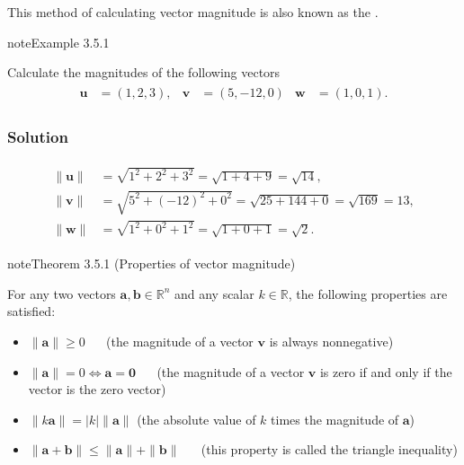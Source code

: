 \documentclass[letterpaper,10pt,english]{jupyterBook}
\begin{document}
\sphinxAtStartPar
This method of calculating vector magnitude is also known as the .
\label{_pages/3.2_Vector_magnitude:magnitude-example}
\begin{sphinxadmonition}{note}{Example 3.5.1}



\sphinxAtStartPar
Calculate the magnitudes of the following vectors
\begin{equation*}
\begin{split} \begin{align*}
    \mathbf{u} &= (1, 2, 3), &
    \mathbf{v} &= (5, -12, 0) &
    \mathbf{w} &= (1, 0, 1).
\end{align*} \end{split}
\end{equation*}\subsubsection*{Solution}
\begin{equation*}
\begin{split} \begin{align*}
    \|\mathbf{u}\| &= \sqrt{1^2 + 2^2 + 3^2} = \sqrt{1+4+9} = \sqrt{14}, \\
    \|\mathbf{v}\| &= \sqrt{5^2 + (-12)^2 + 0^2} = \sqrt{25+144+0} = \sqrt{169} = 13, \\
    \|\mathbf{w}\| &= \sqrt{1^2 + 0^2 + 1^2} = \sqrt{1+0+1} = \sqrt{2}.
\end{align*} \end{split}
\end{equation*}\end{sphinxadmonition}
\label{_pages/3.2_Vector_magnitude:vector-magnitude-properties}
\begin{sphinxadmonition}{note}{Theorem 3.5.1 (Properties of vector magnitude)}



\sphinxAtStartPar
For any two vectors \(\mathbf{a}, \mathbf{b} \in \mathbb{R}^n\) and any scalar \(k \in \mathbb{R}\), the following properties are satisfied:
\begin{itemize}
\item {} 
\sphinxAtStartPar
\(\| \mathbf{a} \| \geq 0\)   (the magnitude of a vector \(\mathbf{v}\) is always non\sphinxhyphen{}negative)

\item {} 
\sphinxAtStartPar
\(\|\mathbf{a}\| = 0 \iff \mathbf{a} = \mathbf{0}\)   (the magnitude of a vector \(\mathbf{v}\) is zero if and only if the vector is the zero vector)

\item {} 
\sphinxAtStartPar
\(\|k\mathbf{a}\| = |k| \| \mathbf{a} \|\) (the absolute value of \(k\) times the magnitude of \(\mathbf{a}\))

\item {} 
\sphinxAtStartPar
\(\| \mathbf{a} + \mathbf{b} \| \leq \|\mathbf{a}\| + \| \mathbf{b} \|\)   (this property is called the triangle inequality)

\end{itemize}
\end{sphinxadmonition}
\end{document}
